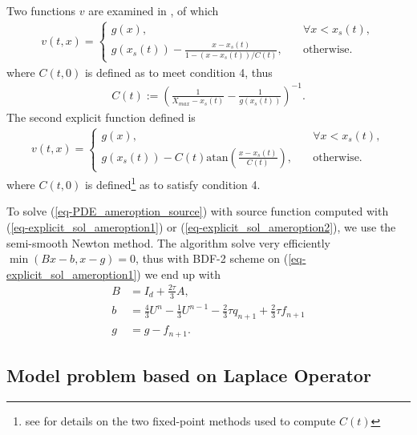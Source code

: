 \documentclass[12pt,a4paper]{article}
\newcommand{\atan}{\text{atan}}
\begin{document}
Two functions $v$ are examined in \cite{Boka}, of which
\begin{align}
	v(t,x) = \left\lbrace \begin{array}{ll}
	g(x), \quad & \forall x < x_s(t), \\
	g(x_s(t)) - \frac{x - x_s(t)}{1 - (x - x_s(t))/C(t) }, \quad & \text{otherwise}.	
	\end{array} \right. \label{eq-explicit_sol_ameroption1}
\end{align}
where $C(t,0)$ is defined as to meet condition 4, thus
\begin{align*}
	C(t) := \left( \frac{1}{X_{max} - x_s(t)} - \frac{1}{g(x_s(t))} \right)^{-1}.
\end{align*}
The second explicit function defined is
\begin{align}
	v(t,x) = \left\lbrace \begin{array}{ll}
	g(x), \quad & \forall x < x_s(t), \\
	g(x_s(t)) - C(t) \atan \left( \frac{x - x_s(t)}{C(t)} \right), \quad & \text{otherwise}.	
	\end{array} \right. \label{eq-explicit_sol_ameroption2}
\end{align}
where $C(t,0)$ is defined\footnote{see \cite{Boka} for details on the two fixed-point methods used to compute $C(t)$} as to satisfy condition 4.

To solve (\ref{eq-PDE_ameroption_source}) with source function computed with (\ref{eq-explicit_sol_ameroption1}) or (\ref{eq-explicit_sol_ameroption2}), we use the semi-smooth Newton method. The algorithm solve very efficiently $\min (Bx - b, x-g) = 0$, thus with BDF-2 scheme on (\ref{eq-explicit_sol_ameroption1}) we end up with
\begin{align*}
	B &= I_d + \frac{2 \tau}{3} A, \\
	b &= \frac{4}{3} U^n - \frac{1}{3} U^{n-1} - \frac{2}{3} \tau q_{n+1} + \frac{2}{3} \tau f_{n+1} \\
	g &= g - f_{n+1}.
\end{align*}

		\subsection{Model problem based on Laplace Operator}
\end{document}

